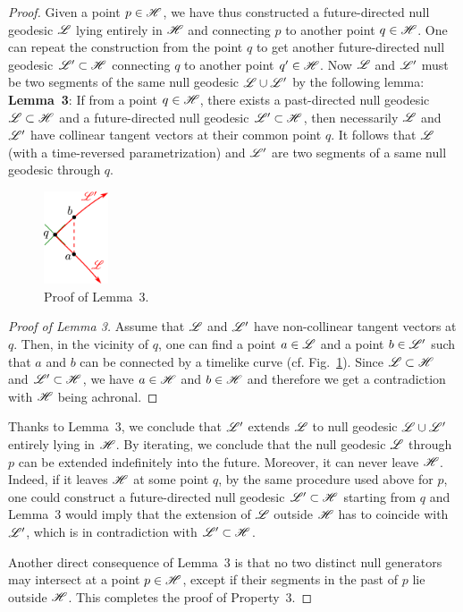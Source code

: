 \begin{proof}
Given a point $p\in\mathscr{H}$, we have thus constructed a
future-directed null geodesic $\mathscr{L}$ lying entirely in $\mathscr{H}$ and
connecting $p$ to another point $q\in\mathscr{H}$. One can
repeat the construction
from the point $q$ to get another future-directed null geodesic $\mathscr{L}'\subset\mathscr{H}$
connecting $q$ to another point $q'\in\mathscr{H}$. Now $\mathscr{L}$ and $\mathscr{L}'$ must
be two segments of the same null geodesic $\mathscr{L}\cup\mathscr{L}'$ by the following lemma:\\[1ex]
\textbf{Lemma~3}: If from a point $q\in\mathscr{H}$, there exists a past-directed
null geodesic $\mathscr{L}\subset\mathscr{H}$ and a future-directed null geodesic $\mathscr{L}'\subset\mathscr{H}$,
then necessarily $\mathscr{L}$ and $\mathscr{L}'$ have collinear tangent vectors at their common point $q$.
It follows that $\mathscr{L}$ (with a time-reversed parametrization) and $\mathscr{L}'$ are two segments
of a same null geodesic through $q$.
\begin{figure}
\centerline{\includegraphics[width=0.17\textwidth]{glo_unique_geod.pdf}}
\caption[]{\label{f:glo:unique_geod} \footnotesize
Proof of Lemma~3.}
\end{figure}
\begin{proof}[Proof of Lemma 3]
Assume that $\mathscr{L}$ and $\mathscr{L}'$ have non-collinear tangent vectors at $q$. Then, in
the vicinity of $q$, one can find a point $a\in\mathscr{L}$ and a point $b\in\mathscr{L}'$
such that $a$ and $b$ can be connected by a timelike curve (cf.
Fig.~\ref{f:glo:unique_geod}). Since $\mathscr{L}\subset\mathscr{H}$ and $\mathscr{L}'\subset\mathscr{H}$, we have $a\in\mathscr{H}$ and
$b\in\mathscr{H}$ and therefore we get a contradiction with $\mathscr{H}$ being achronal.
\end{proof}
Thanks to Lemma~3, we conclude that $\mathscr{L}'$ extends $\mathscr{L}$ to null geodesic
$\mathscr{L}\cup\mathscr{L}'$ entirely lying in $\mathscr{H}$. By iterating, we conclude that
the null geodesic $\mathscr{L}$ through $p$ can be extended indefinitely into the
future. Moreover, it can never leave $\mathscr{H}$. Indeed, if it leaves $\mathscr{H}$ at
some point $q$, by the same procedure used above for $p$, one could construct a future-directed null geodesic
$\mathscr{L}'\subset\mathscr{H}$ starting from $q$ and Lemma~3 would imply that
the extension of $\mathscr{L}$ outside $\mathscr{H}$ has to coincide with $\mathscr{L}'$, which is
in contradiction with $\mathscr{L}'\subset\mathscr{H}$.

Another direct consequence of Lemma~3 is that no two distinct null generators
may intersect at a point $p\in\mathscr{H}$, except if their segments in the past of
$p$ lie outside $\mathscr{H}$.
This completes the proof of Property~3.
\end{proof}


